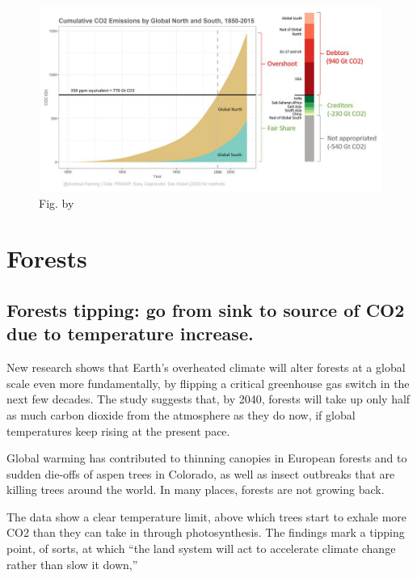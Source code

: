 \documentclass[
]{book}
\begin{document}
\begin{figure}
\centering
\includegraphics{fig/CO2_Emissions_Global_North_South.jpeg}
\caption{Fig. by \citet{AndrewFanning}}
\end{figure}

\hypertarget{forests}{%
\chapter{Forests}\label{forests}}

\hypertarget{forests-tipping-go-from-sink-to-source-of-co2-due-to-temperature-increase.}{%
\section{Forests tipping: go from sink to source of CO2 due to temperature increase.}\label{forests-tipping-go-from-sink-to-source-of-co2-due-to-temperature-increase.}}

New research shows that Earth's overheated climate will
alter forests at a global scale even more fundamentally,
by flipping a critical greenhouse gas switch in the next few decades.
The study suggests that, by 2040, forests will take up only
half as much carbon dioxide from the atmosphere as they do now,
if global temperatures keep rising at the present pace.

Global warming has contributed to thinning canopies in European forests
and to sudden die-offs of aspen trees in Colorado,
as well as insect outbreaks that are killing trees around the world.
In many places, forests are not growing back.

The data show a clear temperature limit,
above which trees start to exhale more CO2 than they can take in through photosynthesis.
The findings mark a tipping point, of sorts, at which ``the land system will act to accelerate climate change rather than slow it down,''
\end{document}
